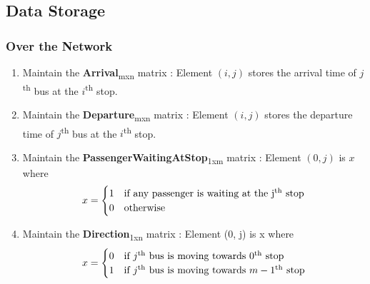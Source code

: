 \subsection{Data Storage}
\subsubsection{Over the Network}

\begin{enumerate}

\item Maintain the \textbf{Arrival}\textsubscript{mxn} matrix : Element $(i, j)$ stores the arrival time of $j$\textsuperscript{th} bus at the $i$\textsuperscript{th} stop.
\item Maintain the \textbf{Departure}\textsubscript{mxn} matrix : Element $(i, j)$ stores the departure time of $j$\textsuperscript{th} bus at the $i$\textsuperscript{th} stop.
\item Maintain the \textbf{PassengerWaitingAtStop}\textsubscript{1xm} matrix : Element $(0, j)$ is $x$ where
 \[ x = \begin{cases} \mbox{1} & \mbox{if any passenger is waiting at the j\textsuperscript{th} stop}  \\ \mbox{0} & \mbox{otherwise} \end{cases} \]
\item Maintain the \textbf{Direction}\textsubscript{1xn} matrix : Element (0, j) is x where
 \[ x = \begin{cases} \mbox{0} & \mbox{if $j$\textsuperscript{th} bus is moving towards $0$\textsuperscript{th} stop}  \\ \mbox{1} & \mbox{if $j$\textsuperscript{th} bus is moving towards $m-1$\textsuperscript{th} stop} \end{cases} \]


\end{enumerate}